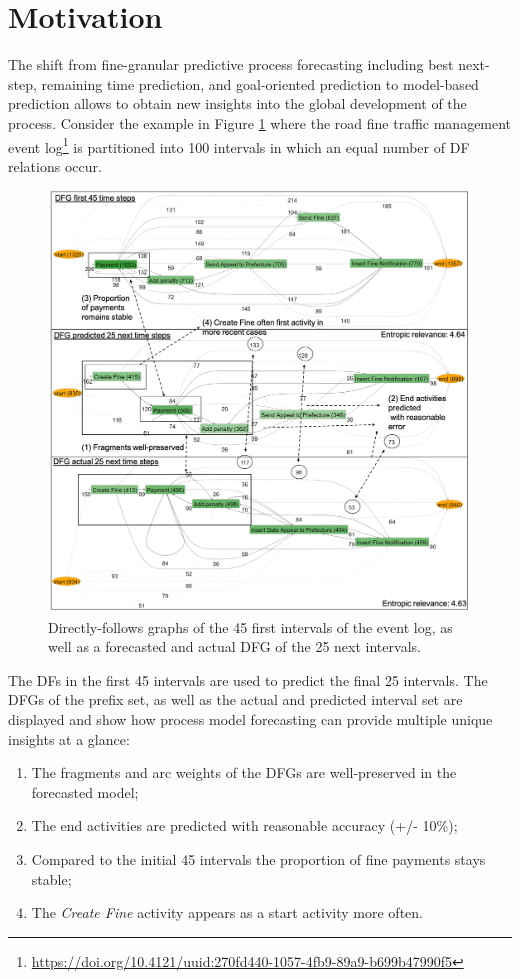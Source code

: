\section{Motivation}\label{sec:2:motivation}

The shift from fine-granular predictive process forecasting including best next-step, remaining time prediction, and goal-oriented prediction to model-based prediction allows to obtain new insights into the global development of the process.
Consider the example in Figure \ref{fig:dfg_example_intro} where the road fine traffic management event log\footnote{\url{https://doi.org/10.4121/uuid:270fd440-1057-4fb9-89a9-b699b47990f5}} is partitioned into 100 intervals in which an equal number of DF relations occur.
\begin{figure}
    \centering
    \includegraphics[width=\textwidth]{img/MotExample2.png}
    \caption{Directly-follows graphs of the 45 first intervals of the event log, as well as a forecasted and actual DFG of the 25 next intervals.}
    \label{fig:dfg_example_intro}
\end{figure}
The DFs in the first 45 intervals are used to predict the final 25 intervals.
The DFGs of the prefix set, as well as the actual and predicted interval set are displayed and show how process model forecasting can provide multiple unique insights at a glance:
\begin{enumerate}
    \item The fragments and arc weights of the DFGs are well-preserved in the forecasted model;
    \item The end activities are predicted with reasonable accuracy (+/- 10\%);
    \item Compared to the initial 45 intervals the proportion of fine payments stays stable;
    \item The \emph{Create Fine} activity appears as a start activity more often.
\end{enumerate}
